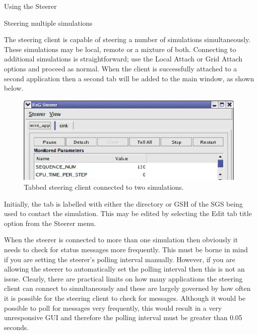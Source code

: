 \documentclass[a4paper,twoside]{article}
\begin{document}
\begin{section}{Using the Steerer}
\begin{subsection}{Steering multiple simulations}

The steering client is capable of steering a number of simulations
simultaneously.  These simulations may be local, remote or a mixture
of both.  Connecting to additional simulations is straightforward; use
the Local Attach or Grid Attach options and proceed as normal.  When
the client is successfully attached to a second application then a
second tab will be added to the main window, as shown below.

\begin{figure}
\centerline{\includegraphics{tabbed_steerer.eps}}
\caption{Tabbed steering client connected to two simulations.}
\label{fig:tabbed}
\end{figure}

Initially, the tab is labelled with either the directory or GSH of the
SGS being used to contact the simulation.  This may be edited by
selecting the Edit tab title option from the Steerer menu.

When the steerer is connected to more than one simulation then
obviously it needs to check for status messages more frequently.  This
must be borne in mind if you are setting the steerer's polling
interval manually.  However, if you are allowing the steerer to
automatically set the polling interval then this is not an issue.
Clearly, there are practical limits on how many applications the
steering client can connect to simultaneously and these are largely
governed by how often it is possible for the steering client to check
for messages.  Although it would be possible to poll for messages very
frequently, this would result in a very unresponsive GUI and therefore
the polling interval must be greater than 0.05 seconds.

\end{subsection} %

\end{section}
\end{document}
